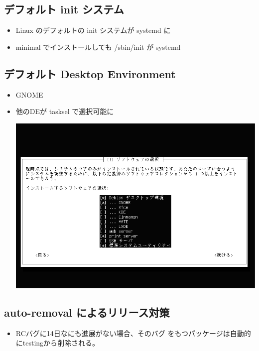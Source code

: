 \documentclass[mingoth,a4paper]{jsarticle}
\begin{document}
\subsection{デフォルト init システム}

\begin{itemize}
\item Linux のデフォルトの init システムが systemd に
\item minimal でインストールしても /sbin/init が systemd
\end{itemize}



\subsection{デフォルト Desktop Environment}

\begin{itemize}
\item GNOME
\item 他のDEが tasksel で選択可能に
\begin{center}
\includegraphics[scale=0.3]{image201410/instaler-tasksel_mono.png}
\end{center}

\end{itemize}


\subsection{auto-removal によるリリース対策}
\begin{itemize}
\item RCバグに14日なにも進展がない場合、そのバグ
をもつパッケージは自動的にtestingから削除される。
\end{itemize}
\end{document}

